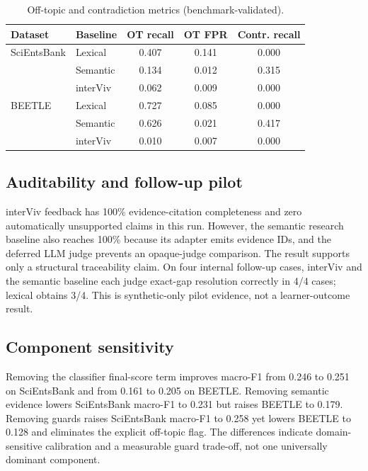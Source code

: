 \documentclass[conference,a4paper]{IEEEtran}
\begin{document}
\begin{table}[t]
\caption{Off-topic and contradiction metrics (benchmark-validated).}
\label{tab:safety}
\centering
\small
\begin{tabular}{@{}llccc@{}}
\toprule
Dataset & Baseline & OT recall & OT FPR & Contr. recall \\
\midrule
SciEntsBank & Lexical  & 0.407 & 0.141 & 0.000 \\
             & Semantic & 0.134 & 0.012 & 0.315 \\
             & interViv & 0.062 & 0.009 & 0.000 \\
\addlinespace
BEETLE      & Lexical  & 0.727 & 0.085 & 0.000 \\
             & Semantic & 0.626 & 0.021 & 0.417 \\
             & interViv & 0.010 & 0.007 & 0.000 \\
\bottomrule
\end{tabular}
\end{table}

\subsection{Auditability and follow-up pilot}

interViv feedback has 100\% evidence-citation completeness and zero
automatically unsupported claims in this run. However, the semantic research
baseline also reaches 100\% because its adapter emits evidence IDs, and the
deferred LLM judge prevents an opaque-judge comparison. The result supports
only a structural traceability claim. On four internal follow-up cases,
interViv and the semantic baseline each judge exact-gap resolution correctly in
4/4 cases; lexical obtains 3/4. This is synthetic-only pilot evidence, not a
learner-outcome result.

\subsection{Component sensitivity}

Removing the classifier final-score term improves macro-F1 from 0.246 to 0.251
on SciEntsBank and from 0.161 to 0.205 on BEETLE. Removing semantic evidence
lowers SciEntsBank macro-F1 to 0.231 but raises BEETLE to 0.179. Removing guards
raises SciEntsBank macro-F1 to 0.258 yet lowers BEETLE to 0.128 and eliminates
the explicit off-topic flag. The differences indicate domain-sensitive
calibration and a measurable guard trade-off, not one universally dominant
component.
\end{document}
